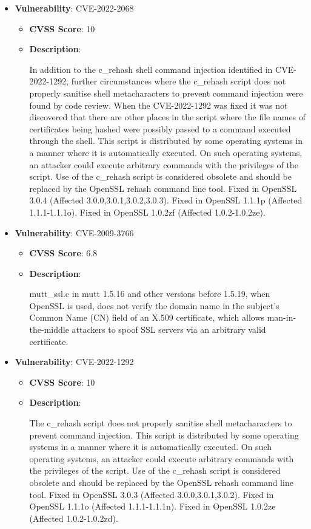 \documentclass{article}
\begin{document}
\begin{itemize}
        \item \textbf{Vulnerability}: CVE-2022-2068
        \begin{itemize}
            \item \textbf{CVSS Score}:  10 
            \item \textbf{Description}:
            \parbox[t]{0.9\linewidth}{
                \ttfamily In addition to the c\_rehash shell command injection identified in CVE-2022-1292, further circumstances where the c\_rehash script does not properly sanitise shell metacharacters to prevent command injection were found by code review. When the CVE-2022-1292 was fixed it was not discovered that there are other places in the script where the file names of certificates being hashed were possibly passed to a command executed through the shell. This script is distributed by some operating systems in a manner where it is automatically executed. On such operating systems, an attacker could execute arbitrary commands with the privileges of the script. Use of the c\_rehash script is considered obsolete and should be replaced by the OpenSSL rehash command line tool. Fixed in OpenSSL 3.0.4 (Affected 3.0.0,3.0.1,3.0.2,3.0.3). Fixed in OpenSSL 1.1.1p (Affected 1.1.1-1.1.1o). Fixed in OpenSSL 1.0.2zf (Affected 1.0.2-1.0.2ze).
            }
        \end{itemize}
    
        \item \textbf{Vulnerability}: CVE-2009-3766
        \begin{itemize}
            \item \textbf{CVSS Score}:  6.8 
            \item \textbf{Description}:
            \parbox[t]{0.9\linewidth}{
                \ttfamily mutt\_ssl.c in mutt 1.5.16 and other versions before 1.5.19, when OpenSSL is used, does not verify the domain name in the subject's Common Name (CN) field of an X.509 certificate, which allows man-in-the-middle attackers to spoof SSL servers via an arbitrary valid certificate.
            }
        \end{itemize}
    
        \item \textbf{Vulnerability}: CVE-2022-1292
        \begin{itemize}
            \item \textbf{CVSS Score}:  10 
            \item \textbf{Description}:
            \parbox[t]{0.9\linewidth}{
                \ttfamily The c\_rehash script does not properly sanitise shell metacharacters to prevent command injection. This script is distributed by some operating systems in a manner where it is automatically executed. On such operating systems, an attacker could execute arbitrary commands with the privileges of the script. Use of the c\_rehash script is considered obsolete and should be replaced by the OpenSSL rehash command line tool. Fixed in OpenSSL 3.0.3 (Affected 3.0.0,3.0.1,3.0.2). Fixed in OpenSSL 1.1.1o (Affected 1.1.1-1.1.1n). Fixed in OpenSSL 1.0.2ze (Affected 1.0.2-1.0.2zd).
            }
        \end{itemize}
    

\end{itemize}
\end{document}
